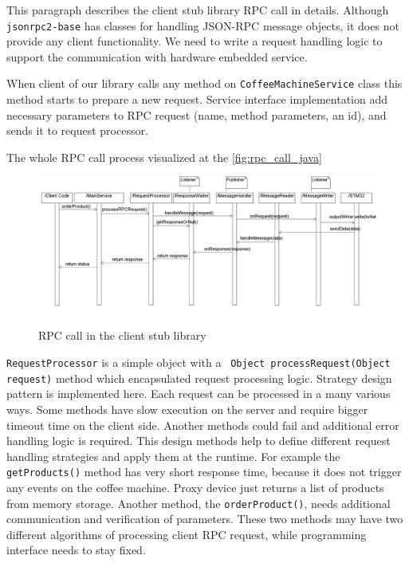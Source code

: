 This paragraph describes the client stub library RPC call in details. 
Although \texttt{jsonrpc2-base} has classes for handling JSON-RPC message
objects, it does not provide any client functionality. 
We need to write a request handling logic to support the communication with
hardware embedded service.

When client of our library calls any method on \texttt{CoffeeMachineService}
class this method starts to prepare a new request. Service interface
implementation add necessary parameters to RPC request (name, method
parameters, an id), and sends it to request processor.

The whole RPC call process visualized at the \autoref{fig:rpc_call_java} 


\begin{figure}
\centering
\scalebox{0.4}
{\includegraphics{../images/implementation/java_flow_diagram.png}}
\caption{RPC call in the client stub library}
\label{fig:rpc_call_java}
\end{figure}

\texttt{RequestProcessor} is a simple object with a ~\texttt{Object
processRequest(Object request)} method which encapsulated request processing
logic. Strategy design pattern is implemented here. 
Each request can be processed in a many various ways.
Some methods  have slow execution  on the server and require bigger timeout time
on the client side. Another methods could fail and additional error handling
logic is required. This design methods help to define different  
request handling strategies and apply them at the runtime.
For example the \texttt{getProducts()}  method has very short response time,
because it does not trigger any events on the coffee machine.
Proxy device just returns a list of products from memory storage. 
Another method, the \texttt{orderProduct()}, needs additional communication and
verification of parameters. 
These two methods may have two different algorithms of processing client RPC
request, while programming interface needs to stay fixed.

